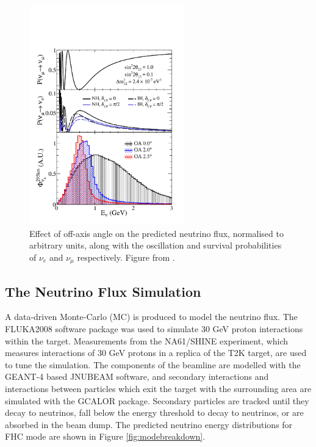 \begin{figure}[!htbp]
\centering
\includegraphics*[width=0.6\textwidth,clip]{figs/oaeffect_pnue_pnumu_flux}
\caption{Effect of off-axis angle on the predicted neutrino flux, normalised to arbitrary units, along with the oscillation and survival probabilities of $\nu_{e}$ and $\nu_{\mu}$ respectively. Figure from \cite{fernandez}.} \label{offaxis}
\end{figure}

\subsection{The Neutrino Flux Simulation}\label{sec:fluxsim}

A data-driven Monte-Carlo (MC) is produced to model the neutrino flux. The FLUKA2008\cite{fluka} software package was used to simulate 30 GeV proton interactions within the target. Measurements from the NA61/SHINE\cite{na61} experiment, which measures interactions of 30 GeV protons in a replica of the T2K target, are used to tune the simulation. The components of the beamline are modelled with the \textsc{GEANT-4}\cite{geant4} based JNUBEAM\cite{jnubeam} software, and secondary interactions and interactions between particles which exit the target with the surrounding area are simulated with the GCALOR package\cite{gcalor}. Secondary particles are tracked until they decay to neutrinos, fall below the energy threshold to decay to neutrinos, or are absorbed in the beam dump. The predicted neutrino energy distributions for FHC mode are shown in Figure \ref{fig:modebreakdown}.

